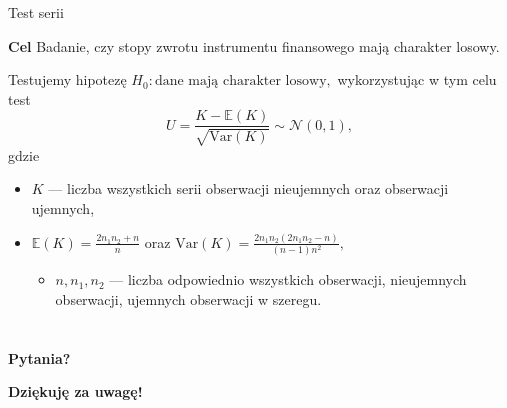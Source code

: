 \documentclass[a4paper, 11pt]{beamer}
\begin{document}
	\begin{frame}{Test serii}
		\begin{block}{\textbf{Cel}}
			Badanie, czy stopy zwrotu instrumentu finansowego mają charakter
			losowy.
		\end{block}
		Testujemy hipotezę $H_{0}: \mbox{dane mają charakter losowy},$ 
		wykorzystując w tym celu test \[
			U=\frac{K-\mathbb{E}\left(K\right)}{\sqrt{\mbox{Var}\left(K\right)}} \sim \mathcal{N}\left(0,1\right),
		\] gdzie
		\begin{itemize}
			\item $K$ --- liczba wszystkich serii obserwacji nieujemnych oraz obserwacji ujemnych,
			\item $\mathbb{E}\left(K\right) = \frac{2 n_1 n_2 + n}{n}$ oraz
				$\mbox{Var}\left(K\right) = \frac{2 n_1 n_2 \left(2 n_1 n_2 - n\right)}{\left(n - 1\right) n^2},$
			\begin{itemize}
				\item $n, n_1, n_2$ --- liczba odpowiednio wszystkich obserwacji, nieujemnych obserwacji, ujemnych obserwacji w szeregu.
			\end{itemize}
		\end{itemize}
	\end{frame}
	
	\section*{}
	
	\begin{frame}
		\center
		\Huge \bfseries
		Pytania?
	\end{frame}

	\begin{frame}
		\center
		\Huge \bfseries
		Dziękuję za uwagę!
	\end{frame}
\end{document}
